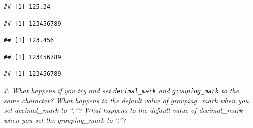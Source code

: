 \documentclass[]{book}
\newenvironment{Shaded}{\begin{snugshade}}{\end{snugshade}}
\newcommand{\CommentTok}[1]{\textcolor[rgb]{0.56,0.35,0.01}{\textit{#1}}}
\newcommand{\DataTypeTok}[1]{\textcolor[rgb]{0.13,0.29,0.53}{#1}}
\newcommand{\KeywordTok}[1]{\textcolor[rgb]{0.13,0.29,0.53}{\textbf{#1}}}
\newcommand{\NormalTok}[1]{#1}
\newcommand{\StringTok}[1]{\textcolor[rgb]{0.31,0.60,0.02}{#1}}
\theoremstyle{definition}
\theoremstyle{definition}
\theoremstyle{definition}
\theoremstyle{remark}
\begin{document}
\begin{verbatim}
## [1] 125.34
\end{verbatim}

\begin{Shaded}
\end{Shaded}

\begin{verbatim}
## [1] 123456789
\end{verbatim}

\begin{Shaded}
\end{Shaded}

\begin{verbatim}
## [1] 123.456
\end{verbatim}

\begin{Shaded}
\end{Shaded}

\begin{verbatim}
## [1] 123456789
\end{verbatim}

\begin{Shaded}
\end{Shaded}

\begin{verbatim}
## [1] 123456789
\end{verbatim}

\emph{2. What happens if you try and set \texttt{decimal\_mark} and
\texttt{grouping\_mark} to the same character? What happens to the
default value of grouping\_mark when you set decimal\_mark to ``,''?
What happens to the default value of decimal\_mark when you set the
grouping\_mark to ``.''?}
\end{document}
